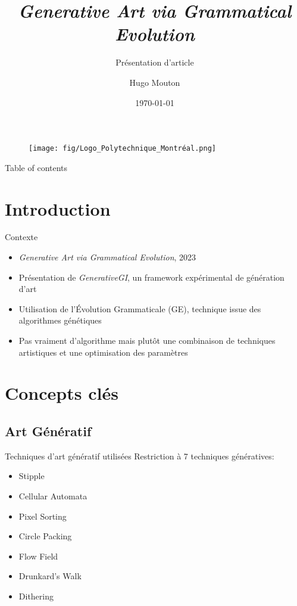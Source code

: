 \documentclass[aspectratio=169]{beamer}
\author{Hugo Mouton}
\title{\textit{Generative Art via Grammatical Evolution}}
\subtitle{Présentation d'article}
\institute{
    Polytechnique Montréal
}
\date{\today}
\begin{document}
\begin{frame}
    \titlepage
    \begin{figure}[htpb]
        \begin{center}
            \vspace{-0.5cm}\texttt{[image: fig/Logo\_Polytechnique\_Montréal.png]}
        \end{center}
    \end{figure}
\end{frame}

\begin{frame}{Table of contents}
    \tableofcontents[sectionstyle=show,subsectionstyle=hide]
\end{frame}

\section{Introduction}

\begin{frame}{Contexte}
    \begin{itemize}
        \item \textit{Generative Art via Grammatical Evolution}, 2023 
        \item Présentation de \textit{GenerativeGI}, un framework expérimental de génération d'art
        \item Utilisation de l'Évolution Grammaticale (GE), technique issue des algorithmes génétiques
        \item Pas vraiment d'algorithme mais plutôt une combinaison de techniques artistiques et une optimisation des paramètres
    \end{itemize}
\end{frame}

\section{Concepts clés}

\subsection{Art Génératif}

\begin{frame}{Techniques d'art génératif utilisées}
    Restriction à 7 techniques génératives: 
    \begin{multicols}{2}
        \begin{itemize}
            \item Stipple
            \item Cellular Automata
            \item Pixel Sorting 
            \item Circle Packing 
            \item Flow Field 
            \item Drunkard's Walk 
            \item Dithering 
        \end{itemize}
    \end{multicols}
\end{frame}
\end{document}
